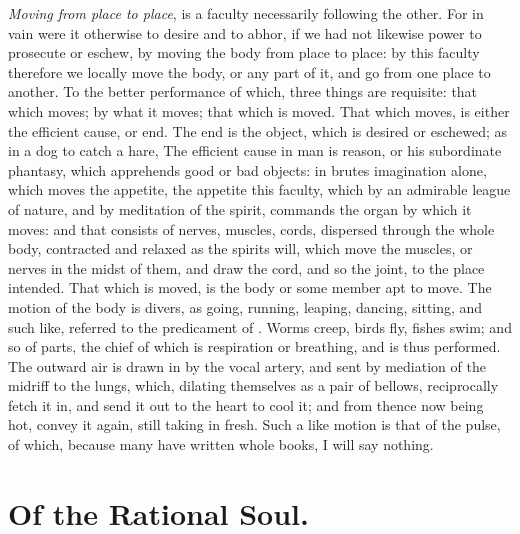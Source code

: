 \emph{Moving from place to place}, is a faculty necessarily following the
other. For in vain were it otherwise to desire and to abhor, if we had not
likewise power to prosecute or eschew, by moving the body from place to place:
by this faculty therefore we locally move the body, or any part of it, and go
from one place to another. To the better performance of which, three things are
requisite: that which moves; by what it moves; that which is moved. That which
moves, is either the efficient cause, or end. The end is the object, which is
desired or eschewed; as in a dog to catch a hare, \etc{} The efficient cause in
man is reason, or his subordinate phantasy, which apprehends good or bad
objects: in brutes imagination alone, which moves the appetite, the appetite
this faculty, which by an admirable league of nature, and by meditation of the
spirit, commands the organ by which it moves: and that consists of nerves,
muscles, cords, dispersed through the whole body, contracted and relaxed as the
spirits will, which move the muscles, or nerves in the
midst of them, and draw the cord, and so  the joint, to the
place intended. That which is moved, is the body or some member apt to move.
The motion of the body is divers, as going, running, leaping, dancing, sitting,
and such like, referred to the predicament of . Worms creep, birds
fly, fishes swim; and so of parts, the chief of which is respiration or
breathing, and is thus performed. The outward air is drawn in by the vocal
artery, and sent by mediation of the midriff to the lungs, which, dilating
themselves as a pair of bellows, reciprocally fetch it in, and send it out to
the heart to cool it; and from thence now being hot, convey it again, still
taking in fresh. Such a like motion is that of the pulse, of which, because
many have written whole books, I will say nothing.

\section{Of the Rational Soul.}

